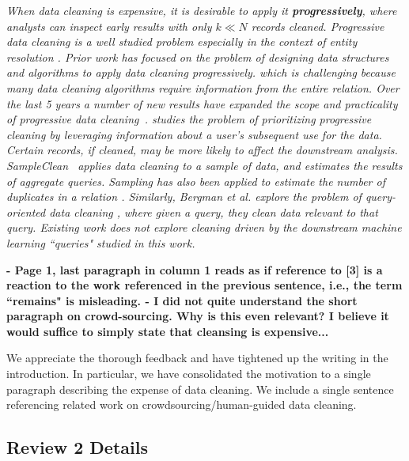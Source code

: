\emph{When data cleaning is expensive, it is desirable to apply it \textbf{progressively}, where analysts can inspect early results with only $k \ll N$ records cleaned.
Progressive data cleaning is a well studied problem especially in the context of entity resolution \cite{altowim2014progressive, whang2014incremental, papenbrock2015progressive, gruenheid2014incremental}.
Prior work has focused on the problem of designing data structures and algorithms to apply data cleaning progressively. which is challenging because many data cleaning algorithms require information from the entire relation.
Over the last 5 years a number of new results have expanded the scope and practicality of progressive data cleaning~\cite{mayfield2010eracer, DBLP:journals/pvldb/YakoutENOI11, yakout2013don}.
\sys studies the problem of prioritizing progressive cleaning by leveraging information about a user's subsequent use for the data.
Certain records, if cleaned, may be more likely to affect the downstream analysis.\\
SampleClean~\cite{wang1999sample} applies data cleaning to a sample of data, and estimates the results of aggregate queries.
Sampling has also been applied to estimate the number of duplicates in a relation \cite{heise2014estimating}. 
Similarly, Bergman et al. explore the problem of query-oriented data cleaning \cite{DBLP:conf/sigmod/BergmanMNT15}, where given a query, they clean data relevant to that query. 
Existing work does not explore cleaning driven by the downstream machine learning ``queries" studied in this work.}

\vspace{0.5em}

\noindent\textbf{- Page 1, last paragraph in column 1 reads as if reference to [3] is a reaction to the work referenced in the previous sentence, i.e., the term ``remains" is misleading.
- I did not quite understand the short paragraph on crowd-sourcing. Why is this even relevant?
 I believe it would suffice to simply state that cleansing is expensive...}

We appreciate the thorough feedback and have tightened up the writing in the introduction. In particular, we have consolidated the motivation to a single paragraph describing the expense of data cleaning. We include a single sentence referencing related work on crowdsourcing/human-guided data cleaning.


\subsection*{Review 2 Details}

